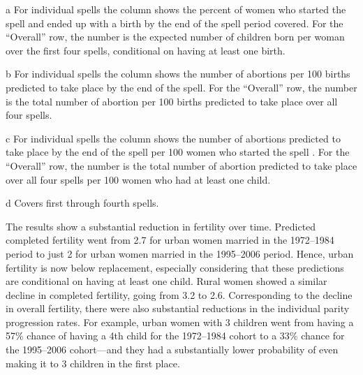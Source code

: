 \documentclass[12pt,letterpaper]{article}
\begin{document}
\begin{table}[htbp]
\begin{center}
\begin{scriptsize}
\begin{threeparttable}
\begin{tablenotes}
\item[a] For individual spells the column shows the percent of women who started the
spell and ended up with a birth by the end of the spell period covered.
For the ``Overall'' row, the number is the expected number of children born per woman over 
the first four spells, conditional on having at least one birth.
\item[b] For individual spells the column shows the number of abortions per 100
births predicted to take place by the end of the spell.
For the ``Overall'' row, the number is the total number of abortion per 100 births 
predicted to take place over all four spells.
\item[c]  For individual spells the column shows the number of abortions 
predicted to take place by the end of the spell per 100 women who started the spell .
For the ``Overall'' row, the number is the total number of abortion 
predicted to take place over all four spells per 100 women who had at least one child.
\item[d] Covers first through fourth spells. 
\end{tablenotes}
\end{threeparttable}
\end{scriptsize}
\end{center}
\end{table}


The results show a substantial reduction in fertility over time.
Predicted completed fertility went from 2.7 for urban women married in  
the 1972--1984 period to just 2 for urban women married in the 1995--2006 period.
Hence, urban fertility is now below replacement, especially considering that
these predictions are conditional on having at least one child.
Rural women showed a similar decline in completed fertility, going from 3.2 to 2.6.
Corresponding to the decline in overall fertility, there were also substantial
reductions in the individual parity progression rates.
For example, urban women with 3 children went from having a 57\% chance of having a 
4th child for the 1972--1984 cohort to a 33\% chance for the 1995--2006 cohort---and 
they had a substantially lower probability of even making it to 3 children
in the first place.
\end{document}

